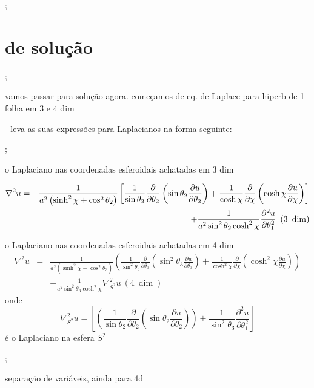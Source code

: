 \documentclass[a4paper,12pt]{article}
\begin{document}
;

\section{de solu\c{c}\~{a}o}

;

vamos passar para solu\c{c}\~{a}o agora. come\c{c}amos de eq. de Laplace
para hiperb de 1 folha em 3 e 4 dim

- leva as suas express\~{o}es para Laplacianos na forma seguinte:

;

o Laplaciano nas coordenadas esferoidais achatadas em 3 dim

\begin{eqnarray*}
\nabla ^{2}u &=&\frac{1}{a^{2}\left( \sinh ^{2}\chi +\cos ^{2}\theta
_{2}\right) }\left[ \frac{1}{\sin \theta _{2}}\frac{\partial }{\partial
\theta _{2}}\left( \sin \theta _{2}\frac{\partial u}{\partial \theta _{2}}%
\right) +\frac{1}{\cosh \chi }\frac{\partial }{\partial \chi }\left( \cosh
\chi \frac{\partial u}{\partial \chi }\right) \right]  \\
&&+\frac{1}{a^{2}\sin ^{2}\theta _{2}\cosh ^{2}\chi }\frac{\partial ^{2}u}{%
\partial \theta _{1}^{2}}\ \left( 3\ \dim \right) 
\end{eqnarray*}

o Laplaciano nas coordenadas esferoidais achatadas em 4 dim%
\begin{eqnarray*}
\nabla ^{2}u &=&\frac{1}{a^{2}\left( \sinh ^{2}\chi +\cos ^{2}\theta
_{3}\right) }\left( \frac{1}{\sin ^{2}\theta _{3}}\frac{\partial }{\partial
\theta _{3}}\left( \sin ^{2}\theta _{3}\frac{\partial u}{\partial \theta _{3}%
}\right) +\frac{1}{\cosh ^{2}\chi }\frac{\partial }{\partial \chi }\left(
\cosh ^{2}\chi \frac{\partial u}{\partial \chi }\right) \right)  \\
&&+\frac{1}{a^{2}\sin ^{2}\theta _{3}\cosh ^{2}\chi }\nabla _{S^{2}}^{2}u\
\left( 4\ \dim \right) 
\end{eqnarray*}%
onde 
\begin{equation*}
\nabla _{S^{2}}^{2}u=\left[ \left( \frac{1}{\sin \theta _{2}}\frac{\partial 
}{\partial \theta _{2}}\left( \sin \theta _{2}\frac{\partial u}{\partial
\theta _{2}}\right) \right) +\frac{1}{\sin ^{2}\theta _{3}}\frac{\partial
^{2}u}{\partial \theta _{1}^{2}}\right] 
\end{equation*}%
\'{e} o Laplaciano na esfera $S^{2}$

;

separa\c{c}\~{a}o de vari\'{a}veis, ainda para 4d
\end{document}
